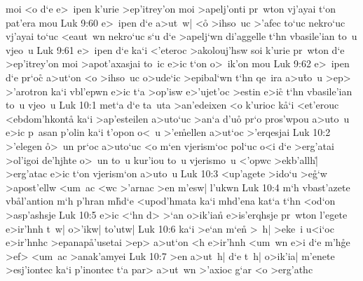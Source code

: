 moi
<o
d`e
e>~ipen
k'urie
>ep'itrey'on
moi
>apelj'onti
pr~wton
vj'ayai
t`on
pat'era
mou\bibvsend
\vs Luk 9:60
e>~ipen
d`e
a>ut~w|
<o\r{}
>ihso~uc
>'afec
to`uc
nekro`uc
vj'ayai
to`uc
<eaut~wn
nekro`uc
s`u
d`e
>apelj`wn
di'aggelle
t`hn
vbasile'ian
to~u
vjeo~u\bibvsend
\vs Luk 9:61
e>~ipen
d`e
ka`i
<'eteroc
>akolouj'hsw
soi
k'urie
pr~wton
d`e
>ep'itrey'on
moi
>apot'axasjai
to~ic
e>ic
t`on
o>~ik'on
mou\bibvsend
\vs Luk 9:62
e>~ipen
d`e
pr`oc\r{}
a>ut`on
<o
>ihso~uc
o>ude`ic
>epibal`wn
t`hn
qe~ira
a>u\r{t}o~u
>ep>
>'arotron
ka`i
vbl'epwn
e>ic
t`a
>op'isw
e>'ujet'oc
>estin
e>ic\r{}
t`hn
vbasile'ian
to~u
vjeo~u\bibvsend
\vs Luk 10:1
met`a
d`e
ta~uta
>an'edeixen
<o
k'urioc
k\r{a}`i
<et'erouc
<ebdom'hkont\r{a}
ka`i
>ap'esteilen
a>uto`uc
>an`a
d'u\r{o}
pr`o
pros'wpou
a>uto~u
e>ic
p~asan
p'olin
ka`i
t'opon
o<~u
>'e\r{m}ellen
a>ut`oc
>'erqesjai\bibvsend
\vs Luk 10:2
>'elegen
\r{o}>~un
pr`oc
a>uto`uc
<o
m`en
vjerism`oc
pol`uc
o<i
d`e
>erg'atai
>ol'igoi
de'hjhte
o>~un
to~u
kur'iou
to~u
vjerismo~u
<'opwc
>ekb'allh|\r{}
>erg'atac
e>ic
t`on
vjerism`on
a>uto~u\bibvsend
\vs Luk 10:3
<up'agete
>ido`u
>e\r{g}`w
>apost'ellw
<um~ac
<wc
>'arnac
>en
m'esw|
l'ukwn\bibvsend
\vs Luk 10:4
m`h
vbast'azete
vb\r{a}l'antion
m`h
p'hran
m\r{h}d`e
<upod'hmata
ka`i
mhd'ena
kat`a
t`hn
<od`on
>asp'ashsje\bibvsend
\vs Luk 10:5
e>ic
<`hn
d>
>`an
o>ik'ian\r{}
e>is'erqhsje
pr~wton
l'egete
e>ir'hnh
t~w|
o>'ikw|
to'utw|\bibvsend
\vs Luk 10:6
ka`i
>e`an
m`en\r{}
>~h|
>eke~i
u<i`oc
e>ir'hnhc
>epanap\r{a}'usetai
>ep>
a>ut`on
<h
e>ir'hnh
<um~wn
e>i
d`e
m'h\r{g}e
>ef>
<um~ac
>anak'amyei\bibvsend
\vs Luk 10:7
>en
a>ut~h|
d`e
t~h|
o>ik'ia|
m'enete
>esj'iontec
ka`i
p'inontec
t`a
par>
a>ut~wn
>'axioc
g`ar
<o
>erg'athc
